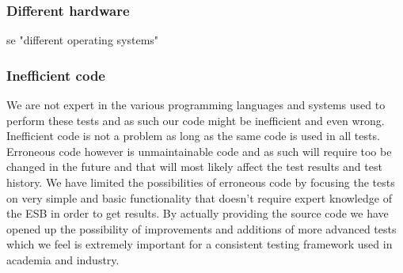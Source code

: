 \subsubsection{Different hardware}
se "different operating systems"
\subsubsection{Inefficient code}
We are not expert in the various programming languages and systems used to perform these tests and as such our code might be inefficient and even wrong. Inefficient code is not a problem as long as the same code is used in all tests. Erroneous code however is unmaintainable code and as such will require too be changed in the future and that will most likely affect the test results and test history. 
We have limited the possibilities of erroneous code by focusing the tests on very simple and basic functionality that doesn't require expert knowledge of the ESB in order to get results.
By actually providing the source code we have opened up the possibility of improvements and additions of more advanced tests which we feel is extremely important for a consistent testing framework used in academia and industry.
